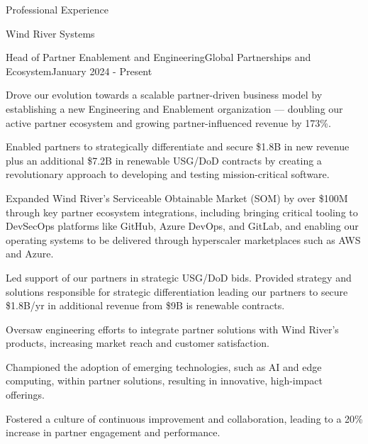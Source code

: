 \documentclass{resume} %
\begin{document}

\begin{rSection}{Professional Experience}
  
  \begin{rCompany}{Wind River Systems}{}{}

    \begin{rSubSubsection}{Head of Partner Enablement and Engineering}{Global Partnerships and Ecosystem}{January 2024 - Present}
      \item Drove our evolution towards a scalable partner-driven business model by establishing a new Engineering and Enablement organization --- doubling our active partner ecosystem and growing partner-influenced revenue by 173\%.
      \item Enabled partners to strategically differentiate and secure \$1.8B in new revenue plus an additional \$7.2B in renewable USG/DoD contracts by creating a revolutionary approach to developing and testing mission-critical software.
      \item Expanded Wind River's Serviceable Obtainable Market (SOM) by over \$100M through key partner ecosystem integrations, including bringing critical tooling to DevSecOps platforms like GitHub, Azure DevOps, and GitLab, and enabling our operating systems to be delivered through hyperscaler marketplaces such as AWS and Azure.
      
      \item Led support of our partners in strategic USG/DoD bids. Provided strategy and solutions  responsible for strategic differentiation leading our partners to secure \$1.8B/yr in additional revenue from \$9B is renewable contracts.
      \item Oversaw engineering efforts to integrate partner solutions with Wind River's products, increasing market reach and customer satisfaction.
      \item Championed the adoption of emerging technologies, such as AI and edge computing, within partner solutions, resulting in innovative, high-impact offerings.
      \item Fostered a culture of continuous improvement and collaboration, leading to a 20\% increase in partner engagement and performance.

    \end{rSubSubsection}
    

\end{rCompany}
\end{rSection}
\end{document}

